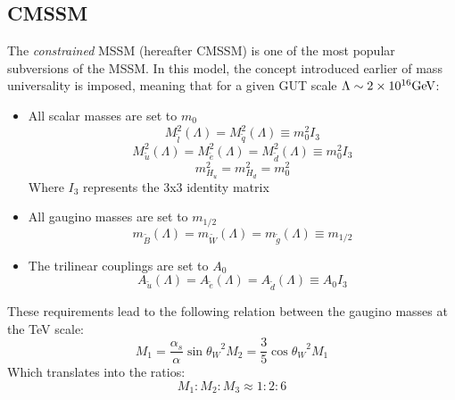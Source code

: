 


\subsection{CMSSM}
\label{sec:CMSSM}
The \textit{constrained} MSSM (hereafter CMSSM) is one of the most popular subversions of the MSSM. In this model, the concept introduced earlier of mass universality is imposed, meaning that for a given GUT scale $\Lambda \sim 2\times 10^{16} \rm GeV$:
\begin{itemize}
\item All scalar masses are set to $m_0$
\begin{equation}
M_{\tilde{l}}^2(\Lambda) = M_{\tilde{q}}^2(\Lambda) \equiv m_0^2 I_3
\end{equation}
\begin{equation}
M_{\tilde{u}}^2(\Lambda) = M_{\tilde{e}}^2(\Lambda) = M_{\tilde{d}}^2(\Lambda) \equiv m_0^2 I_3
\end{equation}
\begin{equation}
m_{H_u}^2 = m_{H_d}^2 = m_0^2
\end{equation}
Where $I_3$ represents the 3x3 identity matrix
\item All gaugino masses are set to $m_{1/2}$
\begin{equation}
m_{\tilde{B}}(\Lambda) = m_{\tilde{W}}(\Lambda) = m_{\tilde{g}}(\Lambda) \equiv m_{1/2}
\end{equation}
\item The trilinear couplings are set to $A_0$
\begin{equation}
A_{\tilde{u}}(\Lambda) = A_{\tilde{e}}(\Lambda) = A_{\tilde{d}}(\Lambda) \equiv A_0 I_3
\end{equation}
\end{itemize} 
These requirements lead to the following relation between the gaugino masses at the TeV scale: 
\begin{equation}
M_1 = \frac{\alpha_s}{\alpha} \sin{\theta_W}^2 M_2 = \frac{3}{5}\cos{\theta_W}^2 M_1
\end{equation}
Which translates into the ratios:
\begin{equation}
M_1 : M_2 : M_3 \approx 1 : 2 : 6
\end{equation}

